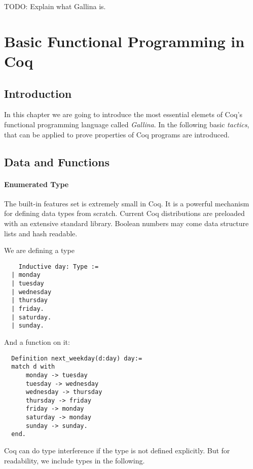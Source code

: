 

TODO: Explain what Gallina is.


\section{Basic Functional Programming in Coq}

\subsection{Introduction}

In this chapter we are going to introduce the most essential elemets of Coq's functional programming language called {\itshape  Gallina}. 
In the following basic {\itshape tactics}, that can be applied to prove properties of Coq programs are introduced.


\subsection{Data and Functions}
 \paragraph{Enumerated Type}
  The built-in features set is extremely small in Coq. It is a powerful mechanism for defining data types from scratch.
  Current Coq distributions are preloaded with an extensive standard library.
  Boolean numbers may come data structure lists and hash readable. 
  
  \begin{example}
  We are defining a type 
  \begin{lstlisting}
    Inductive day: Type :=
  | monday
  | tuesday
  | wednesday
  | thursday
  | friday.
  | saturday.
  | sunday.
  \end{lstlisting} 
  And a function on it: 
  \begin{lstlisting}
  Definition next_weekday(d:day) day:=
  match d with 
	  monday -> tuesday
	  tuesday -> wednesday
	  wednesday -> thursday
	  thursday -> friday
	  friday -> monday
	  saturday -> monday
	  sunday -> sunday.
  end.  
  \end{lstlisting}
  \end{example}

  Coq can do type interference if the type is not defined explicitly.
  But for readability, we include types in the following.
   
